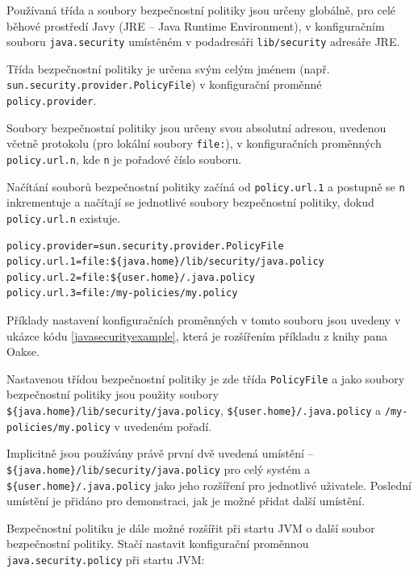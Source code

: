 Používaná třída a soubory bezpečnostní politiky jsou určeny globálně, pro celé běhové prostředí Javy (JRE -- Java Runtime Environment),
v konfiguračním souboru {\tt java.security} umístěném v podadresáři {\tt lib/security} adresáře JRE. \cite{refPolicyFiles}

Třída bezpečnostní politiky je určena svým celým jménem (např. {\tt sun.security.provider{\linebreak}.PolicyFile}) v konfigurační proměnné {\tt policy.provider}. \cite{refPolicyFiles}

Soubory bezpečnostní politiky jsou určeny svou absolutní adresou, uvedenou včetně protokolu (pro lokální soubory {\tt file:}),
v konfiguračních proměnných {\tt policy.url.n}, kde {\tt n} je pořadové číslo souboru. \cite{refPolicyFiles}

Načítání souborů bezpečnostní politiky začíná od {\tt policy.url.1} a postupně se {\tt n} inkrementuje a načítají se jednotlivé soubory bezpečnostní politiky,
dokud {\tt policy.url.n} existuje. \cite{refPolicyFiles}

\begin{lstlisting}[caption=Význačnější proměnné konfiguračního souboru {\tt java.security}, label=javasecurityexample]
policy.provider=sun.security.provider.PolicyFile
policy.url.1=file:${java.home}/lib/security/java.policy
policy.url.2=file:${user.home}/.java.policy
policy.url.3=file:/my-policies/my.policy
\end{lstlisting}

Příklady nastavení konfiguračních proměnných v tomto souboru jsou uvedeny v ukázce kódu \ref{javasecurityexample}, která je rozšířením příkladu z knihy pana Oakse. \cite[5.3.1]{oaks}

Nastavenou třídou bezpečnostní politiky je zde třída {\tt PolicyFile} a jako soubory bezpečnostní politiky jsou použity
soubory {\tt \$\{java.home\}/lib/security/java.policy}, {\tt \$\{user{\linebreak}.home\}/.java.policy} a {\tt /my-policies/my.policy} v uvedeném pořadí.

Implicitně jsou používány právě první dvě uvedená umístění -- {\tt \$\{java.home\}/lib/secu{\linebreak}rity/java.policy} pro celý systém a {\tt \$\{user.home\}/.java.policy} jako jeho rozšíření pro jednotlivé uživatele. Poslední umístění je přidáno pro demonstraci, jak je možné přidat další umístění. \cite{refSecurity}

Bezpečnostní politiku je dále možné rozšířit při startu JVM o další soubor bezpečnostní politiky. Stačí nastavit konfigurační proměnnou {\tt java.security.policy} při startu JVM: \cite[5.3.1]{oaks}

